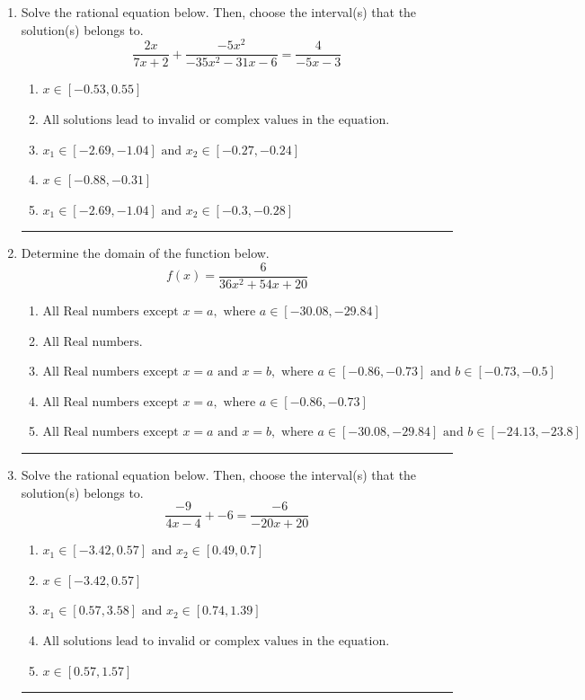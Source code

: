 \documentclass[14pt]{extbook}
\newcommand{\litem}[1]{\item#1\hspace*{-1cm}\rule{\textwidth}{0.4pt}}
\begin{document}
\begin{enumerate}
{\begin{enumerate}[label=\Alph*.]
\end{enumerate} }
\litem{
Solve the rational equation below. Then, choose the interval(s) that the solution(s) belongs to.\[ \frac{2x}{7x + 2} + \frac{-5x^{2}}{-35x^{2} -31 x -6} = \frac{4}{-5x -3} \]\begin{enumerate}[label=\Alph*.]
\item \( x \in [-0.53,0.55] \)
\item \( \text{All solutions lead to invalid or complex values in the equation.} \)
\item \( x_1 \in [-2.69, -1.04] \text{ and } x_2 \in [-0.27,-0.24] \)
\item \( x \in [-0.88,-0.31] \)
\item \( x_1 \in [-2.69, -1.04] \text{ and } x_2 \in [-0.3,-0.28] \)

\end{enumerate} }
\litem{
Determine the domain of the function below.\[ f(x) = \frac{6}{36x^{2} +54 x + 20} \]\begin{enumerate}[label=\Alph*.]
\item \( \text{All Real numbers except } x = a, \text{ where } a \in [-30.08, -29.84] \)
\item \( \text{All Real numbers.} \)
\item \( \text{All Real numbers except } x = a \text{ and } x = b, \text{ where } a \in [-0.86, -0.73] \text{ and } b \in [-0.73, -0.5] \)
\item \( \text{All Real numbers except } x = a, \text{ where } a \in [-0.86, -0.73] \)
\item \( \text{All Real numbers except } x = a \text{ and } x = b, \text{ where } a \in [-30.08, -29.84] \text{ and } b \in [-24.13, -23.8] \)

\end{enumerate} }
\litem{
Solve the rational equation below. Then, choose the interval(s) that the solution(s) belongs to.\[ \frac{-9}{4x -4} + -6 = \frac{-6}{-20x + 20} \]\begin{enumerate}[label=\Alph*.]
\item \( x_1 \in [-3.42, 0.57] \text{ and } x_2 \in [0.49,0.7] \)
\item \( x \in [-3.42,0.57] \)
\item \( x_1 \in [0.57, 3.58] \text{ and } x_2 \in [0.74,1.39] \)
\item \( \text{All solutions lead to invalid or complex values in the equation.} \)
\item \( x \in [0.57,1.57] \)


\end{enumerate}}
\end{enumerate}
\end{document}

